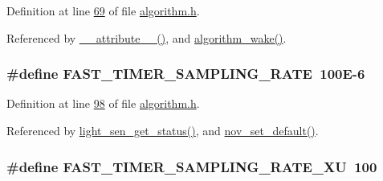 Definition at line \hyperlink{a00021_source_l00069}{69} of file \hyperlink{a00021_source}{algorithm.\+h}.



Referenced by \hyperlink{a00041_source_l00025}{\+\_\+\+\_\+attribute\+\_\+\+\_\+()}, and \hyperlink{a00038_source_l00670}{algorithm\+\_\+wake()}.

\hypertarget{a00021_a3a4dcb8af26a561d90607a41a3745806}{
\subsubsection[{F\+A\+S\+T\+\_\+\+T\+I\+M\+E\+R\+\_\+\+S\+A\+M\+P\+L\+I\+N\+G\+\_\+\+R\+A\+T\+E}]{\setlength{\rightskip}{0pt plus 5cm}\#define F\+A\+S\+T\+\_\+\+T\+I\+M\+E\+R\+\_\+\+S\+A\+M\+P\+L\+I\+N\+G\+\_\+\+R\+A\+T\+E~100\+E-\/6}}\label{a00021_a3a4dcb8af26a561d90607a41a3745806}


Definition at line \hyperlink{a00021_source_l00098}{98} of file \hyperlink{a00021_source}{algorithm.\+h}.



Referenced by \hyperlink{a00047_source_l00204}{light\+\_\+sen\+\_\+get\+\_\+status()}, and \hyperlink{a00060_source_l00760}{nov\+\_\+set\+\_\+default()}.

\hypertarget{a00021_a87ea9a0eaa474d8b8f672cfa5cbb091f}{
\subsubsection[{F\+A\+S\+T\+\_\+\+T\+I\+M\+E\+R\+\_\+\+S\+A\+M\+P\+L\+I\+N\+G\+\_\+\+R\+A\+T\+E\+\_\+\+X\+U}]{\setlength{\rightskip}{0pt plus 5cm}\#define F\+A\+S\+T\+\_\+\+T\+I\+M\+E\+R\+\_\+\+S\+A\+M\+P\+L\+I\+N\+G\+\_\+\+R\+A\+T\+E\+\_\+\+X\+U~100}}\label{a00021_a87ea9a0eaa474d8b8f672cfa5cbb091f}


